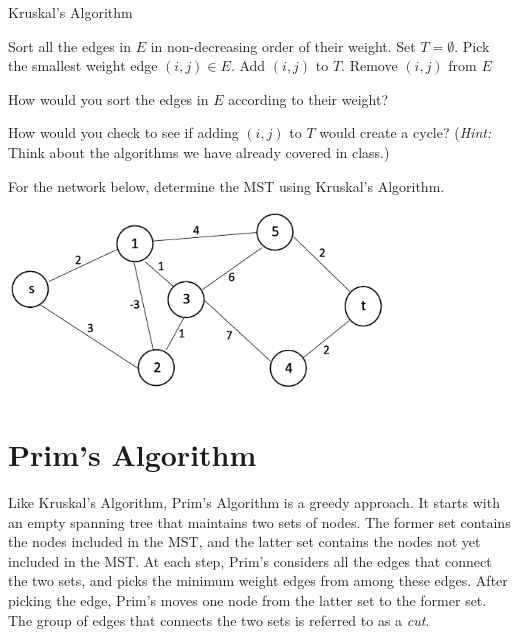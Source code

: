 \documentclass[12pt]{article}
\theoremstyle{definition}
\begin{document}
\begin{algorithm}
\caption{Kruskal's Algorithm}
\begin{algorithmic} 
\STATE Sort all the edges in $E$ in non-decreasing order of their weight. 
\STATE Set $T = \emptyset$.
	\STATE Pick the smallest weight edge $(i,j) \in E$.
		\STATE Add $(i,j)$ to $T$.
	\ENDIF
	\STATE Remove $(i,j)$ from $E$
\ENDWHILE
\end{algorithmic}
\end{algorithm}


How would you sort the edges in $E$ according to their weight? 

\vfill

How would you check to see if adding $(i,j)$ to $T$ would create a cycle? (\emph{Hint:} Think about the algorithms we have already covered in class.)
\vfill

\newpage

For the network below, determine the MST using Kruskal's Algorithm.

\begin{center}
\includegraphics[width=10cm]{minspanningtree}
\end{center}


\newpage
\section{Prim's Algorithm}

Like Kruskal's Algorithm, Prim's Algorithm is a greedy approach. It starts with an empty spanning tree that maintains two sets of nodes. The former set contains the nodes included in the MST, and the latter set contains the nodes not yet included in the MST. At each step, Prim's considers all the edges that connect the two sets, and picks the minimum weight edges from among these edges. After picking the edge, Prim's moves one node from the latter set to the former set. The group of edges that connects the two sets is referred to as a \emph{cut}. 
\end{document}
